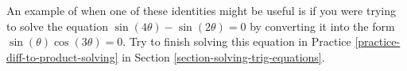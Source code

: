 An example of when one of these identities might be useful is if you were trying to solve the equation $\sin(4\theta)-\sin(2\theta)=0$ by converting it into the form $\sin(\theta)\cos(3\theta)=0$. Try to finish solving this equation in Practice \ref{practice-diff-to-product-solving} in Section \ref{section-solving-trig-equations}.